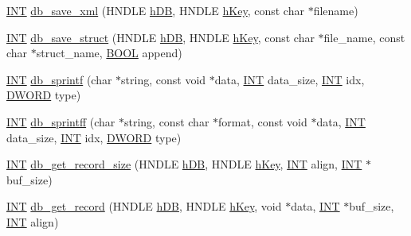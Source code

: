 \begin{DoxyCompactItemize}
\item 
\hyperlink{vppg_8h_a392e62da233ed3e2f7c3fd4f487a3896}{INT} \hyperlink{group__odbfunctionc_gac967051f0433c70482abca0450c038e6}{db\_\-save\_\-xml} (HNDLE \hyperlink{mevb_8c_ab1f60c53f74e806a3b9f687af38d7421}{hDB}, HNDLE \hyperlink{mevb_8c_a8cd567d23219ba7fc83280cf20caf1c2}{hKey}, const char $\ast$filename)
\item 
\hyperlink{vppg_8h_a392e62da233ed3e2f7c3fd4f487a3896}{INT} \hyperlink{group__odbfunctionc_ga07197b44867ca47300b1f69f2c2c3e86}{db\_\-save\_\-struct} (HNDLE \hyperlink{mevb_8c_ab1f60c53f74e806a3b9f687af38d7421}{hDB}, HNDLE \hyperlink{mevb_8c_a8cd567d23219ba7fc83280cf20caf1c2}{hKey}, const char $\ast$file\_\-name, const char $\ast$struct\_\-name, \hyperlink{vt2_8h_a239c7f0d40651c3e419c5b9651507d14}{BOOL} append)
\item 
\hyperlink{vppg_8h_a392e62da233ed3e2f7c3fd4f487a3896}{INT} \hyperlink{group__odbfunctionc_ga594e4b0d774999bdcc1161e8b6b84052}{db\_\-sprintf} (char $\ast$string, const void $\ast$data, \hyperlink{vppg_8h_a392e62da233ed3e2f7c3fd4f487a3896}{INT} data\_\-size, \hyperlink{vppg_8h_a392e62da233ed3e2f7c3fd4f487a3896}{INT} idx, \hyperlink{vt2_8h_a798af1e30bc65f319c1a246cecf59e39}{DWORD} type)
\item 
\hyperlink{vppg_8h_a392e62da233ed3e2f7c3fd4f487a3896}{INT} \hyperlink{group__odbfunctionc_ga2d16cbf1e235c26b1b1fa8e75a811d50}{db\_\-sprintff} (char $\ast$string, const char $\ast$format, const void $\ast$data, \hyperlink{vppg_8h_a392e62da233ed3e2f7c3fd4f487a3896}{INT} data\_\-size, \hyperlink{vppg_8h_a392e62da233ed3e2f7c3fd4f487a3896}{INT} idx, \hyperlink{vt2_8h_a798af1e30bc65f319c1a246cecf59e39}{DWORD} type)
\item 
\hyperlink{vppg_8h_a392e62da233ed3e2f7c3fd4f487a3896}{INT} \hyperlink{group__odbfunctionc_ga70b171dc66b0673fc9ed773fca31b7dc}{db\_\-get\_\-record\_\-size} (HNDLE \hyperlink{mevb_8c_ab1f60c53f74e806a3b9f687af38d7421}{hDB}, HNDLE \hyperlink{mevb_8c_a8cd567d23219ba7fc83280cf20caf1c2}{hKey}, \hyperlink{vppg_8h_a392e62da233ed3e2f7c3fd4f487a3896}{INT} align, \hyperlink{vppg_8h_a392e62da233ed3e2f7c3fd4f487a3896}{INT} $\ast$buf\_\-size)
\item 
\hyperlink{vppg_8h_a392e62da233ed3e2f7c3fd4f487a3896}{INT} \hyperlink{group__odbfunctionc_ga7a9c0dd3e4bec48a07be99d2fc0e08cf}{db\_\-get\_\-record} (HNDLE \hyperlink{mevb_8c_ab1f60c53f74e806a3b9f687af38d7421}{hDB}, HNDLE \hyperlink{mevb_8c_a8cd567d23219ba7fc83280cf20caf1c2}{hKey}, void $\ast$data, \hyperlink{vppg_8h_a392e62da233ed3e2f7c3fd4f487a3896}{INT} $\ast$buf\_\-size, \hyperlink{vppg_8h_a392e62da233ed3e2f7c3fd4f487a3896}{INT} align)

\end{DoxyCompactItemize}
